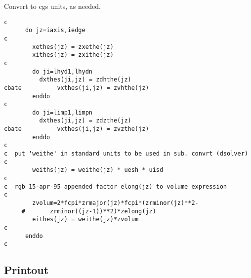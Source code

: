 Convert to cgs units, as needed.

\begin{verbatim}
c
      do jz=iaxis,iedge
c
        xethes(jz) = zxethe(jz)
        xithes(jz) = zxithe(jz)
c
        do ji=lhyd1,lhydn
          dxthes(ji,jz) = zdhthe(jz)
cbate          vxthes(ji,jz) = zvhthe(jz)
        enddo
c
        do ji=limp1,limpn
          dxthes(ji,jz) = zdzthe(jz)
cbate          vxthes(ji,jz) = zvzthe(jz)
        enddo
c
c  put 'weithe' in standard units to be used in sub. convrt (dsolver)
c
        weiths(jz) = weithe(jz) * uesh * uisd
c
c  rgb 15-apr-95 appended factor elong(jz) to volume expression
c
        zvolum=2*fcpi*zrmajor(jz)*fcpi*(zrminor(jz)**2-
     #       zrminor((jz-1))**2)*zelong(jz)
        eithes(jz) = weithe(jz)*zvolum
c
      enddo
c
\end{verbatim}

\subsection{Printout}

